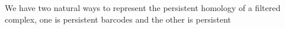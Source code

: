 %
%



%


We have two natural ways to represent the persistent homology of a 
filtered complex, one is persistent barcodes and the other is persistent 

